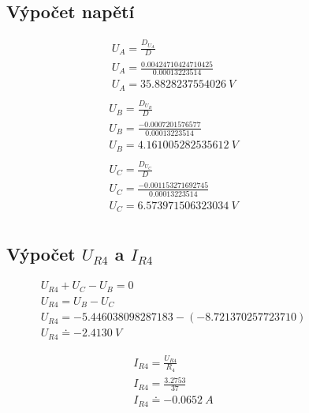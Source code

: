 \begin{figure}[h!]
    \subsection{Výpočet napětí}
    \begin{gather*}
        U_A = \frac{D_{U_{A}}}{D} \\
        U_A = \frac{0.00424710424710425}{0.00013223514} \\
        U_A = 35.8828237554026 \: V \\
    \end{gather*}
    \begin{gather*}
        U_B = \frac{D_{U_{B}}}{D} \\
        U_B = \frac{-0.0007201576577}{0.00013223514} \\
        U_B = 4.161005282535612 \: V \\
    \end{gather*}
    \begin{gather*}
        U_C = \frac{D_{U_{C}}}{D} \\
        U_C = \frac{-0.001153271692745}{0.00013223514} \\
        U_C = 6.573971506323034 \: V \\
    \end{gather*}
\end{figure}

\begin{figure}[h!]
    \subsection{Výpočet $U_{R4}$ a $I_{R4}$}
    \begin{gather*}
        U_{R4} + U_C - U_B = 0 \\
        U_{R4} = U_B - U_C \\
        U_{R4} = -5.446038098287183 - (-8.721370257723710) \\
        U_{R4} \doteq -2.4130 \: V
    \end{gather*}

    \begin{gather*}
        I_{R4} = \frac{U_{R4}}{R_4} \\
        I_{R4} = \frac{3.2753}{37} \\
        I_{R4} \doteq -0.0652 \: A
    \end{gather*}
\end{figure}

\clearpage